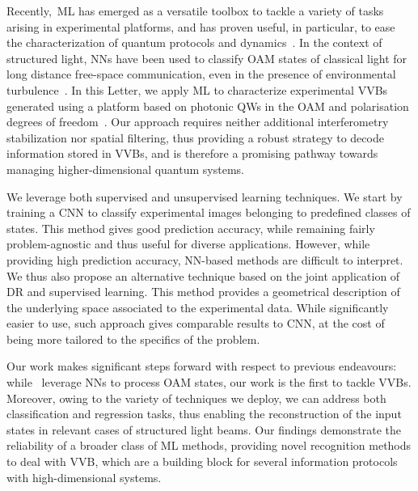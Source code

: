 Recently,~\ac{ML} has emerged as a versatile toolbox to tackle a variety of tasks arising in experimental platforms, and has proven useful, in particular, to ease the characterization of quantum protocols and dynamics~\cite{carrasquilla2019reconstructing,giordani2018experimental, agresti2019pattern,lumino2018experimental,rocchetto2019experimental,butler2018machine,fischer2006predicting,melnikov2018active,wang2017experimental}.
In the context of structured light, \acp{NN} have been used to classify \ac{OAM} states of classical light for long distance free-space communication, even in the presence of environmental turbulence~\cite{krenn2014communication,krenn2016twisted,doster2017machine,park2018demultiplexing,lohani2018turbulence,li2018joint}.
In this  Letter, we apply \ac{ML} to characterize experimental \acp{VVB} generated using a platform
 based on photonic \acp{QW} in the \ac{OAM} and polarisation degrees of freedom~\cite{innocenti2017quantum,giordani2019experimental}.
Our approach requires neither additional interferometry stabilization nor spatial filtering, thus providing a robust strategy to decode information stored in \acp{VVB}, and is therefore a promising pathway  towards managing higher-dimensional quantum systems. 

We leverage both supervised and unsupervised learning techniques. We start by training a \ac{CNN} to classify experimental images belonging to  predefined classes of states. This method gives good prediction accuracy, while remaining fairly problem-agnostic and thus useful for diverse applications. However, while providing high prediction accuracy, NN-based methods are  difficult to interpret.
We thus  also propose an alternative technique  based on the joint application of \ac{DR}  and supervised learning.
This method provides a geometrical description of the underlying space associated to the experimental data.
While significantly easier to  use,  such approach gives comparable results to CNN,
at the cost of being more tailored to the specifics of the problem.

Our work makes significant steps forward with respect to previous endeavours: while~\cite{krenn2014communication,krenn2016twisted,doster2017machine, park2018demultiplexing, lohani2018turbulence, li2018joint} leverage \acp{NN} to process \ac{OAM} states, our work is the first to tackle VVBs. Moreover, owing to the variety of techniques we deploy, we can address both classification and regression tasks, thus enabling the reconstruction of the input states in relevant cases of structured light beams.
Our findings demonstrate the reliability of a broader class of ML methods, providing novel recognition methods to deal with VVB, which are a building block for several information protocols with high-dimensional systems.



